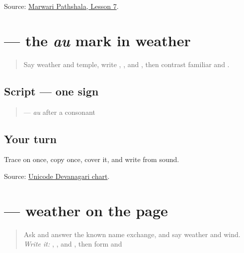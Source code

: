 \begin{tcolorbox}[breakable,colback=teal!4,colframe=teal!35!black,title={Before you move on}]
Source: \href{https://www.marwaripathshala.com/marwari-lesson-7-english}{Marwari Pathshala, Lesson 7}.
\end{tcolorbox}
\section[\texorpdfstring{\mw{ौ} (au)}{ौ (au)}]{ — the \emph{au} mark in weather}

\label{lesson:MW-W12-au-matra}



\begin{quote}
Say weather and temple, write \textbf{}, \textbf{}, and \textbf{}, then contrast familiar \textbf{} and \textbf{}.
\end{quote}

\subsection*{Script — one sign}
\begin{quote}
\textbf{} — \emph{au} after a consonant
\end{quote}

\subsection*{Your turn}
Trace \textbf{} on \textbf{} once, copy \textbf{} once, cover it, and write \textbf{} from sound.

\begin{tcolorbox}[breakable,colback=teal!4,colframe=teal!35!black,title={Before you move on}]
Source: \href{https://www.unicode.org/charts/PDF/U0900.pdf}{Unicode Devanagari chart}.
\end{tcolorbox}
\section[\texorpdfstring{\mw{मौसम} (mausam)}{मौसम (mausam)}]{ — weather on the page}

\label{lesson:MW-C12-mausam}



\begin{quote}
Ask and answer the known name exchange, and say weather and wind. \emph{Write it:} \textbf{}, \textbf{}, and \textbf{}, then form \textbf{} and \textbf{}
\end{quote}

